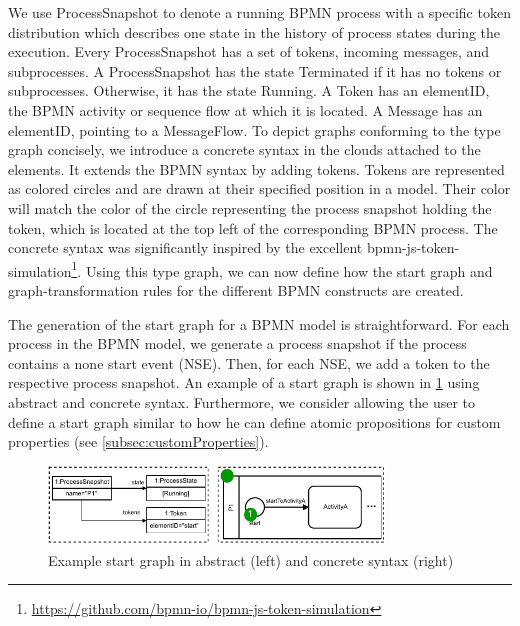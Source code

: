 \documentclass[submission, copyright, creativecommons]{eptcs}
\begin{document}
We use \textsf{ProcessSnapshot} to denote a running BPMN process with a specific token distribution which describes one state in the history of process states during the execution.
Every \textsf{ProcessSnapshot} has a set of \textsf{tokens}, incoming \textsf{messages}, and \textsf{subprocesses}.
A \textsf{ProcessSnapshot} has the state \textsf{Terminated} if it has no \textsf{tokens} or \textsf{subprocesses}.
Otherwise, it has the state \textsf{Running}.
A \textsf{Token} has an \textsf{elementID}, the BPMN activity or sequence flow at which it is located.
A \textsf{Message} has an \textsf{elementID}, pointing to a \textsf{MessageFlow}.
To depict graphs conforming to the type graph concisely, we introduce a concrete syntax in the clouds attached to the elements.
It extends the BPMN syntax by adding tokens.
Tokens are represented as colored circles and are drawn at their specified position in a model.
Their color will match the color of the circle representing the process snapshot holding the token, which is located at the top left of the corresponding BPMN process.
The concrete syntax was significantly inspired by the excellent bpmn-js-token-simulation\footnote{\url{https://github.com/bpmn-io/bpmn-js-token-simulation}}.
Using this type graph, we can now define how the start graph and graph-transformation rules for the different BPMN constructs are created.

The generation of the start graph for a BPMN model is straightforward.
For each process in the BPMN model, we generate a process snapshot if the process contains a none start event (NSE).
Then, for each NSE, we add a token to the respective process snapshot.
An example of a start graph is shown in \cref{fig:startGraph} using abstract and concrete syntax.
Furthermore, we consider allowing the user to define a start graph similar to how he can define atomic propositions for custom properties (see \cref{subsec:customProperties}).

\begin{figure}[h]
    \centering
    \includegraphics[width=0.8\textwidth]{images/startGraph.pdf}
    \caption{Example start graph in abstract (left) and concrete syntax (right)}
    \label{fig:startGraph}
\end{figure}
\end{document}
